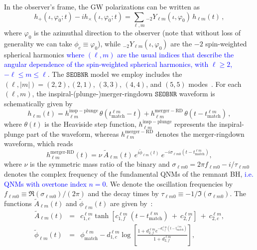 \documentclass[twocolumn,prd,aps,superscriptaddress,preprintnumbers,tightenlines,showpacs,nofootinbib,eqsecnum,amsfonts,amsmath]{revtex4-1}
\newcommand{\SEOB}{\texttt{SEOBNR}}
\begin{document}
In the observer's frame, the GW polarizations can be written as
%
\begin{equation}
h_+(\iota,\varphi_0;t ) - i h_\times(\iota,\varphi_0;t) = \sum_{\ell, m} {}_{-\!2}Y_{\ell m}(\iota,\varphi_0)\, h_{\ell m}(t)\,,
\end{equation}
%
where $\varphi_0$ is the azimuthal direction to the observer (note that without loss of generality we can take $\phi_c\equiv\varphi_0$), while ${}_{-\!2}Y_{\ell m}(\iota,\varphi_0)$ are the $-2$ spin-weighted spherical harmonics \textcolor{blue}{where $(\ell,m)$ are the usual indices that describe the angular dependence of the spin-weighted spherical harmonics, with $\ell\geq 2$, $-\ell\leq m\leq \ell$}. The $\SEOB$ model we employ includes the $(\ell, |m|)=(2,2),(2,1)$, $(3,3)$, $(4,4)$, and $(5,5)$ modes~\cite{Cotesta:2018fcv}. For each $(\ell, m)$, the inspiral-(plunge-)merger-ringdown $\SEOB$ waveform is schematically given by
%
\begin{equation}
h_{\ell m}(t) = h_{\ell m}^\mathrm{insp-plunge}\, \theta(t_\mathrm{match}^{\ell m} - t) + h_{\ell m}^\mathrm{merger-RD}\,\theta(t-t_\mathrm{match}^{\ell m})\,,
\end{equation}
where $\theta(t)$ is the Heaviside step function, $h_{\ell m}^\mathrm{insp-plunge}$ represents the inspiral-plunge part of the waveform, whereas $h_{\ell m}^\mathrm{merger-RD}$ denotes the merger-ringdown waveform, which reads~\citep{Bohe:2016gbl,Cotesta:2018fcv}
%
\begin{equation}
\label{RD}
h_{\ell m}^{\textrm{merger-RD}}(t) = \nu \ \tilde{A}_{\ell m}(t)\ e^{i \tilde{\phi}_{\ell m}(t)} \ e^{-i \sigma_{\ell m 0}(t-t_{\textrm{match}}^{\ell m})},
\end{equation}
%
where $\nu$ is the symmetric mass ratio of the binary and $\sigma_{\ell m0} = 2\pi f_{\ell m 0} -i/\tau_{\ell m 0}$ denotes the complex frequency of the fundamental QNMs of the remnant BH, \textcolor{blue}{i.e. QNMs with overtone index $n=0$}. We denote the oscillation frequencies by $f_{\ell m  0}\equiv \Re(\sigma_{\ell m0})/(2\pi)$ and the decay times by $\tau_{\ell m 0}\equiv -1/\Im(\sigma_{\ell m0}) $.
The functions $\tilde{A}_{\ell m}(t)$ and $\tilde{\phi}_{\ell m}(t)$ are given by~\cite{Bohe:2016gbl,Cotesta:2018fcv}:
%
\begin{subequations}
\begin{eqnarray}
\label{eq:ansatz_amp}
\tilde{A}_{\ell m}(t) &=& c_{1,c}^{\ell m} \tanh[c_{1,f}^{\ell m}\ (t-t_{\textrm{match}}^{\ell m}) \ +\ c_{2,f}^{\ell m}] \ + \ c_{2,c}^{\ell m},\\
\label{eq:ansatz_phase}
\tilde{\phi}_{\ell m}(t) &=& \phi_{\textrm{match}}^{\ell m} - d_{1,c}^{\ell m} \log\left[\frac{1+d_{2,f}^{\ell m} e^{-d_{1,f}^{\ell m}(t-t_{\textrm{match}}^{\ell m})}}{1+d_{2,f}^{\ell m}}\right],
\end{eqnarray}
\end{subequations}
\end{document}
